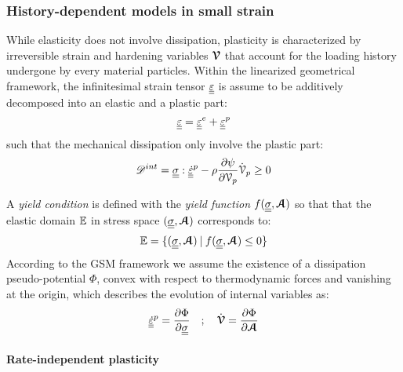 \subsubsection*{History-dependent models in small strain}
While elasticity does not involve dissipation, plasticity is characterized by irreversible strain and hardening variables ${\boldsymbol{\mathcal{V}}}$ that account for the loading history undergone by every material particles. Within the linearized geometrical framework, the infinitesimal strain tensor ${\underline{\underline{\varepsilon}}}$ is assume to be additively decomposed into an elastic and a plastic part:
\begin{equation}
  \label{eq:additive_plast}
  {\underline{\underline{\varepsilon}}} = {\underline{\underline{\varepsilon}}}^e + {\underline{\underline{\varepsilon}}}^p
\end{equation}
such that the mechanical dissipation only involve the plastic part:
\begin{equation*}
  \mathscr{D}^{int}={\underline{\underline{\sigma}}}:{\underline{\underline{\dot{\varepsilon}}}}^p -\rho \frac{\partial \psi}{\partial \mathcal{V}_p}\dot{\mathcal{V}}_p \geq 0
\end{equation*}

A \textit{yield condition} is defined with the \textit{yield function} $f({\underline{\underline{\sigma}}},{\boldsymbol{\mathcal{A}}})$ so that that the elastic domain $\mathbb{E}$ in stress space $({\underline{\underline{\sigma}}},{\boldsymbol{\mathcal{A}}})$ corresponds to:
\begin{equation*}
  \mathbb{E} = \{ ({\underline{\underline{\sigma}}},{\boldsymbol{\mathcal{A}}})\: | \: f({\underline{\underline{\sigma}}},{\boldsymbol{\mathcal{A}}}) \leq 0\}
\end{equation*}
According to the GSM framework \cite{GSM} we assume the existence of a dissipation pseudo-potential $\Phi$, convex with respect to thermodynamic forces and vanishing at the origin, which describes the evolution of internal variables as:
\begin{equation}
  \label{eq:pseudo-potential}
  {\underline{\underline{\dot{\varepsilon}}}}^p=\frac{\partial \Phi}{\partial {\underline{\underline{\sigma}}}} \quad ; \quad \dot{{\boldsymbol{\mathcal{V}}}} = \frac{\partial \Phi}{\partial {\boldsymbol{\mathcal{A}}}}
\end{equation}
\paragraph*{Rate-independent plasticity}

